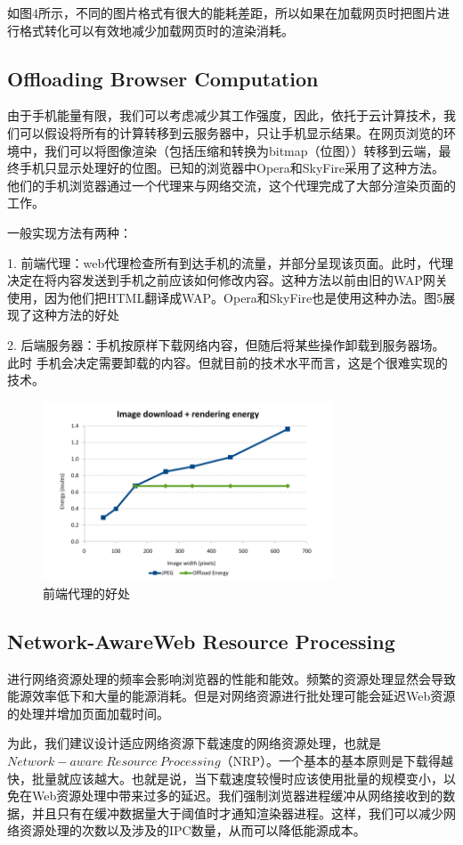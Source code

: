 \documentclass{sig-alternate-05-2015}
\begin{document}
如图4\cite{13}所示，不同的图片格式有很大的能耗差距，所以如果在加载网页时把图片进行格式转化可以有效地减少加载网页时的渲染消耗。

\subsection{Offloading Browser Computation}

由于手机能量有限，我们可以考虑减少其工作强度，因此，依托于云计算技术，我们可以假设将所有的计算转移到云服务器中，只让手机显示结果。在网页浏览的环境中，我们可以将图像渲染（包括压缩和转换为bitmap（位图））转移到云端，最终手机只显示处理好的位图。已知的浏览器中Opera和SkyFire采用了这种方法。他们的手机浏览器通过一个代理来与网络交流，这个代理完成了大部分渲染页面的工作。

一般实现方法有两种：

1.	前端代理：web代理检查所有到达手机的流量，并部分呈现该页面。此时，代理决定在将内容发送到手机之前应该如何修改内容。这种方法以前由旧的WAP网关使用，因为他们把HTML翻译成WAP。Opera和SkyFire也是使用这种办法。图5\cite{13}展现了这种方法的好处

2.	后端服务器：手机按原样下载网络内容，但随后将某些操作卸载到服务器场。 此时
手机会决定需要卸载的内容。但就目前的技术水平而言，这是个很难实现的技术。

\begin{figure}[htbp]
	\centering
	\includegraphics[width=3.4in]{./figure5}
	\caption{前端代理的好处}\label{fig:tasks}
\end{figure}

\subsection{Network-AwareWeb Resource Processing}

进行网络资源处理的频率会影响浏览器的性能和能效。频繁的资源处理显然会导致能源效率低下和大量的能源消耗。但是对网络资源进行批处理可能会延迟Web资源的处理并增加页面加载时间。

为此，我们建议设计适应网络资源下载速度的网络资源处理，也就是$Network-aware\ Resource\ Processing$（NRP）\cite{1}。一个基本的基本原则是下载得越快，批量就应该越大。也就是说，当下载速度较慢时应该使用批量的规模变小，以免在Web资源处理中带来过多的延迟。我们强制浏览器进程缓冲从网络接收到的数据，并且只有在缓冲数据量大于阈值时才通知渲染器进程。这样，我们可以减少网络资源处理的次数以及涉及的IPC数量，从而可以降低能源成本。
\end{document}
